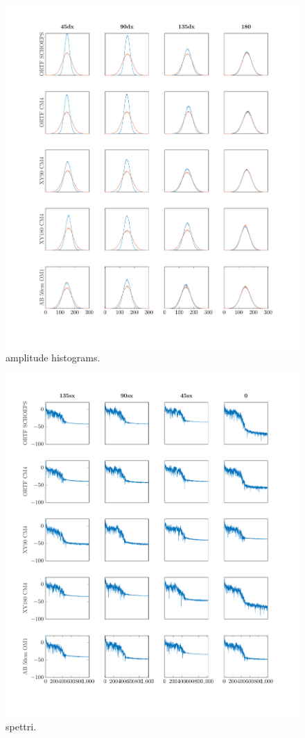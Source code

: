 \begin{figure}[t]
  \centering
  \includegraphics[width=.97\textwidth]{img/statistiche/pdf/amplitude_histograms_2}
  \caption{amplitude histograms.}
  \label{amphist2}
\end{figure}

\begin{figure}[t]
  \centering
  \includegraphics[width=.97\textwidth]{img/statistiche/pdf/spectra_1}
  \caption{spettri.}
  \label{spettri1}
\end{figure}

